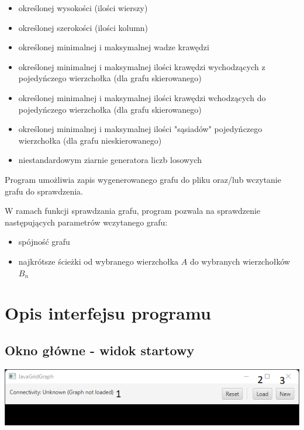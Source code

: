 \documentclass[11pt,a4paper]{report}
\begin{document}
    \begin{itemize}
        \item określonej wysokości (ilości wierszy)
        \item określonej szerokości (ilości kolumn)
        \item określonej minimalnej i maksymalnej wadze krawędzi
        \item określonej minimalnej i maksymalnej ilości krawędzi wychodzących z pojedyńczego wierzchołka (dla grafu skierowanego)
        \item określonej minimalnej i maksymalnej ilości krawędzi wchodzących do pojedyńczego wierzchołka (dla grafu skierowanego)
        \item określonej minimalnej i maksymalnej ilości "sąsiadów" pojedyńczego wierzchołka (dla grafu nieskierowanego)
        \item niestandardowym ziarnie generatora liczb losowych
    \end{itemize}

    Program umożliwia zapis wygenerowanego grafu do pliku oraz/lub wczytanie grafu do sprawdzenia.
    
    \vspace{4em}

    W ramach funkcji sprawdzania grafu, program pozwala na sprawdzenie następujących parametrów wczytanego grafu:

    \begin{itemize}
        \item spójność grafu
        \item najkrótsze ścieżki od wybranego wierzchołka $A$ do wybranych wierzchołków $B_n$
    \end{itemize}




    \newpage
    \section{Opis interfejsu programu}

    \subsection{Okno główne - widok startowy}

    \includegraphics[width=\textwidth]{view1.png}
\end{document}
